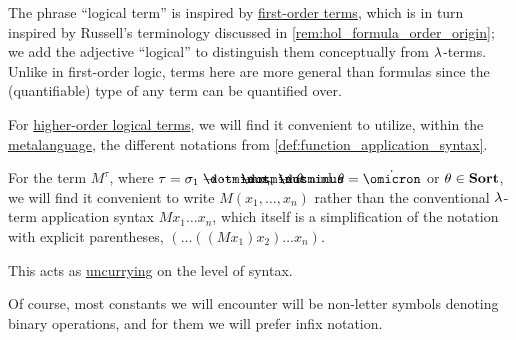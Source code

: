 \begin{comments}
  \item The phrase \enquote{logical term} is inspired by \hyperref[def:first_order_syntax/term]{first-order terms}, which is in turn inspired by Russell's terminology discussed in \cref{rem:hol_formula_order_origin}; we add the adjective \enquote{logical} to distinguish them conceptually from \( {\mathrm \lambda} \)-terms. Unlike in first-order logic, terms here are more general than formulas since the (quantifiable) type of any term can be quantified over.
\end{comments}

\begin{remark}\label{rem:quantifiable_type_uncurrying}
  For \hyperref[def:hol_term]{higher-order logical terms}, we will find it convenient to utilize, within the \hyperref[con:metalogic]{metalanguage}, the different notations from \cref{def:function_application_syntax}.

  For the term \( M^\tau \), where \( \tau = \sigma_1 \synimplies \cdots \synimplies \sigma_n \synimplies \theta \) and \( \theta = \syn\omicron \) or \( \theta \in \op*{Sort} \), we will find it convenient to write \( M(x_1, \ldots, x_n) \) rather than the conventional \( {\mathrm \lambda} \)-term application syntax \( M x_1 \ldots x_n \), which itself is a simplification of the notation with explicit parentheses, \( (\ldots ((M x_1) x_2) \ldots x_n) \).

  This acts as \hyperref[def:function_currying]{uncurrying} on the level of syntax.

  Of course, most constants we will encounter will be non-letter symbols denoting binary operations, and for them we will prefer infix notation.
\end{remark}

